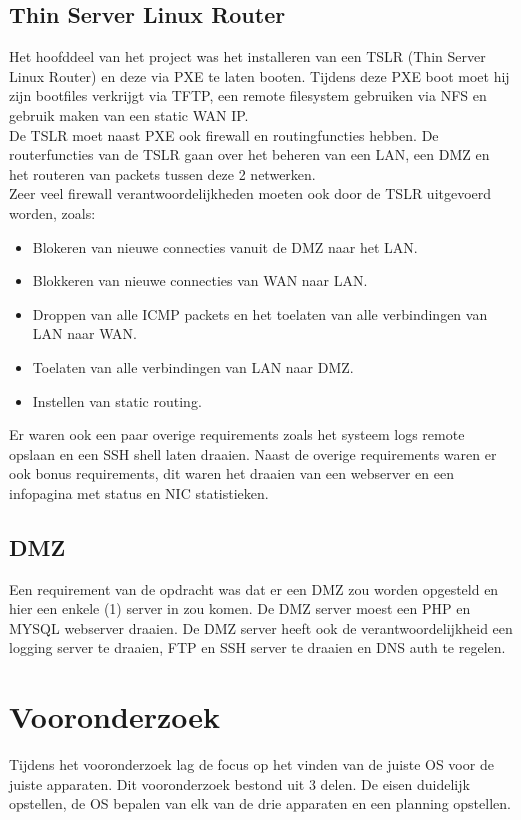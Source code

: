 \documentclass[12pt]{article}
\begin{document}
\subsection{Thin Server Linux Router} %
\label{sub:thin_server_linux_router}
Het hoofddeel van het project was het installeren van een TSLR (Thin Server Linux Router) en deze via PXE te laten booten. Tijdens deze PXE boot moet hij zijn bootfiles verkrijgt via TFTP, een remote filesystem gebruiken via NFS en gebruik maken van een static WAN IP.
\\De TSLR moet naast PXE ook firewall en routingfuncties hebben. De routerfuncties van de TSLR gaan over het beheren van een LAN, een DMZ en het routeren van packets tussen deze 2 netwerken.
\\Zeer veel firewall verantwoordelijkheden moeten ook door de TSLR uitgevoerd worden, zoals:
\begin{itemize}
\item Blokeren van nieuwe connecties vanuit de DMZ naar het LAN.
\item Blokkeren van nieuwe connecties van WAN naar LAN.
\item Droppen van alle ICMP packets en het toelaten van alle verbindingen van LAN naar WAN.
\item Toelaten van alle verbindingen van LAN naar DMZ.
\item Instellen van static routing.
\end{itemize}
Er waren ook een paar overige requirements zoals het systeem logs remote opslaan en een SSH shell laten draaien. Naast de overige requirements waren er ook bonus requirements, dit waren het draaien van een webserver en een infopagina met status en NIC statistieken.
\subsection{DMZ} %
\label{sub:dmz}
Een requirement van de opdracht was dat er een DMZ zou worden opgesteld en hier een enkele (1) server in zou komen. De DMZ server moest een PHP en MYSQL webserver draaien. De DMZ server heeft ook de verantwoordelijkheid een logging server te draaien, FTP en SSH server te draaien en DNS auth te regelen.
\section{Vooronderzoek}
Tijdens het vooronderzoek lag de focus op het vinden van de juiste OS voor de juiste apparaten. Dit vooronderzoek bestond uit 3 delen. De eisen duidelijk opstellen, de OS bepalen van elk van de drie apparaten en een planning opstellen.\\
\end{document}
